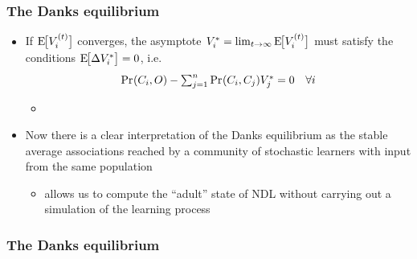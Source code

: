 \begin{frame}
  \frametitle{The Danks equilibrium}

  \begin{itemize}
  \item If $\mathrm{E}_{}\!\bigl[V_i^{(t)}\bigr]$ converges, the asymptote $V_i^* = \lim_{t\to \infty} \mathrm{E}_{}\!\bigl[V_i^{(t)}\bigr]$ must satisfy the  conditions $\mathrm{E}_{}\!\bigl[\Delta V_i^*\bigr] = 0$, i.e.
    \[
    \mathop{\mathrm{Pr}_{}}(C_i, O) - \textstyle\sum_{j=1}^n \mathop{\mathrm{Pr}_{}}(C_i, C_j) V_j^* = 0 \quad \forall i
    \]
    \citep[p.~113]{Danks:03}
    \begin{itemize}
    \item[]
    \end{itemize}
  \item Now there is a clear interpretation of the Danks equilibrium as the stable average associations reached by a community of stochastic learners with input from the same population
    \begin{itemize}
    \item[\hand] allows us to compute the ``adult'' state of NDL without carrying out a simulation of the learning process
    \end{itemize}
  \end{itemize}
\end{frame}

\begin{frame}[c]
  \frametitle{The Danks equilibrium}

  \centering
\end{frame}

